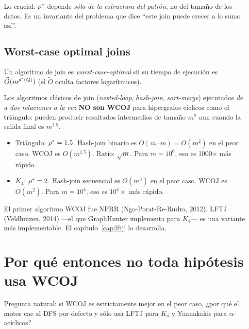 \begin{nota}
Lo crucial: \(\rho^{*}\) depende \emph{sólo de la estructura del
patrón}, no del tamaño de los datos. Es un invariante del problema
que dice ``este join puede crecer a lo sumo así''.
\end{nota}

\subsection{Worst-case optimal joins}

\begin{definition}
Un algoritmo de join es \emph{worst-case-optimal} sii su tiempo de
ejecución es \(\widetilde{O}(m^{\rho^{*}(Q)})\) (el \(\widetilde{O}\)
oculta factores logarítmicos).
\end{definition}

\noindent
Los algoritmos clásicos de join (\emph{nested-loop},
\emph{hash-join}, \emph{sort-merge}) ejecutados \emph{de a dos
relaciones a la vez} \textbf{NO son WCOJ} para hipergrafos cíclicos
como el triángulo: pueden producir resultados intermedios de tamaño
\(m^2\) aun cuando la salida final es \(m^{1.5}\).

\begin{itemize}
    \item Triángulo: \(\rho^{*} = 1.5\). Hash-join binario es
    \(O(m \cdot m) = O(m^2)\) en el peor caso. WCOJ es \(O(m^{1.5})\).
    Ratio: \(\sqrt{m}\). Para \(m = 10^6\), eso es 1000\(\times\)
    más rápido.
    \item \(K_4\): \(\rho^{*} = 2\). Hash-join secuencial es
    \(O(m^3)\) en el peor caso. WCOJ es \(O(m^2)\). Para \(m = 10^4\),
    eso es \(10^4\times\) más rápido.
\end{itemize}

\noindent
El primer algoritmo WCOJ fue NPRR (Ngo-Porat-Re-Rudra, 2012). LFTJ
(Veldhuizen, 2014) ---el que GraphHunter implementa para \(K_4\)---
es una variante más implementable. El capítulo~\ref{cap:lftj} lo
desarrolla.

\section{Por qué entonces no toda hipótesis usa WCOJ}

Pregunta natural: si WCOJ es estrictamente mejor en el peor caso,
¿por qué el motor cae al DFS por defecto y sólo usa LFTJ para \(K_4\)
y Yannakakis para \(\alpha\)-acíclicos?

